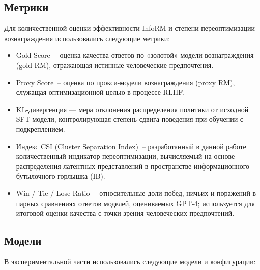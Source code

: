 \subsection{Метрики}

Для количественной оценки эффективности InfoRM и степени переоптимизации вознаграждения использовались следующие метрики:

\begin{itemize}
    \item Gold Score~-- оценка качества ответов по «золотой» модели вознаграждения (gold RM), отражающая истинные человеческие предпочтения.
    
    \item Proxy Score~-- оценка по прокси-модели вознаграждения (proxy RM), служащая оптимизационной целью в процессе RLHF.
    
    \item KL-дивергенция — мера отклонения распределения политики от исходной SFT-модели, контролирующая степень сдвига поведения при обучении с подкреплением.
    
    \item Индекс CSI (Cluster Separation Index)~-- разработанный в данной работе количественный индикатор переоптимизации, вычисляемый на основе распределения латентных представлений в пространстве информационного бутылочного горлышка (IB).
    
    \item Win / Tie / Lose Ratio~-- относительные доли побед, ничьих и поражений в парных сравнениях ответов моделей, оцениваемых GPT-4; используется для итоговой оценки качества с точки зрения человеческих предпочтений.
\end{itemize}

\subsection{Модели}

В экспериментальной части использовались следующие модели и конфигурации:

